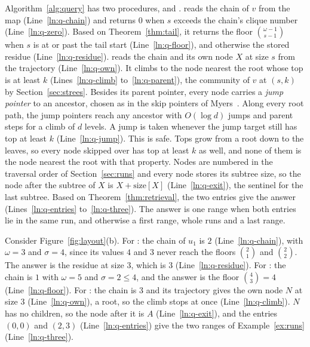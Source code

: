Algorithm~\ref{alg:query} has two procedures, \Value and \Community.
%
\Value reads the chain of $v$ from the map (Line~\ref{ln:q-chain}) and returns $0$ when $s$ exceeds the chain's clique number (Line~\ref{ln:q-zero}).
%
Based on Theorem~\ref{thm:tail}, it returns the floor $\binom{\omega-1}{s-1}$ when $s$ is at or past the tail start (Line~\ref{ln:q-floor}), and otherwise the stored residue (Line~\ref{ln:q-residue}).
%
\Community reads the chain and its own node $X$ at size $s$ from the trajectory (Line~\ref{ln:q-own}).
%
It climbs to the node nearest the root whose top is at least $k$ (Lines~\ref{ln:q-climb} to~\ref{ln:q-parent}), the community of $v$ at $(s,k)$ by Section~\ref{sec:strees}.
%
Besides its parent pointer, every node carries a \textit{jump pointer} to an ancestor, chosen as in the skip pointers of Myers~\cite{Myers1983}.
%
Along every root path, the jump pointers reach any ancestor with $O(\log d)$ jumps and parent steps for a climb of $d$ levels.
%
A jump is taken whenever the jump target still has top at least $k$ (Line~\ref{ln:q-jump}).
%
This is safe.
%
Tops grow from a root down to the leaves, so every node skipped over has top at least $k$ as well, and none of them is the node nearest the root with that property.
%
Nodes are numbered in the traversal order of Section~\ref{sec:runs} and every node stores its subtree size, so the node after the subtree of $X$ is $X+\mathrm{size}[X]$ (Line~\ref{ln:q-exit}), the sentinel for the last subtree.
%
Based on Theorem~\ref{thm:retrieval}, the two entries give the answer (Lines~\ref{ln:q-entries} to~\ref{ln:q-three}).
%
The answer is one range when both entries lie in the same run, and otherwise a first range, whole runs and a last range.

\begin{example}\label{ex:query}
Consider Figure~\ref{fig:layout}(b).
%
For : the chain of $u_1$ is $2$ (Line~\ref{ln:q-chain}), with $\omega=3$ and $\sigma=4$, since its values $4$ and $3$ never reach the floors $\binom{2}{1}$ and $\binom{2}{2}$.
%
The answer is the residue at size $3$, which is $3$ (Line~\ref{ln:q-residue}).
%
For : the chain is $1$ with $\omega=5$ and $\sigma=2\le4$, and the answer is the floor $\binom{4}{3}=4$ (Line~\ref{ln:q-floor}).
%
For : the chain is $3$ and its trajectory gives the own node $N$ at size $3$ (Line~\ref{ln:q-own}), a root, so the climb stops at once (Line~\ref{ln:q-climb}).
%
$N$ has no children, so the node after it is $A$ (Line~\ref{ln:q-exit}), and the entries $(0,0)$ and $(2,3)$ (Line~\ref{ln:q-entries}) give the two ranges of Example~\ref{ex:runs} (Line~\ref{ln:q-three}).
\end{example}

